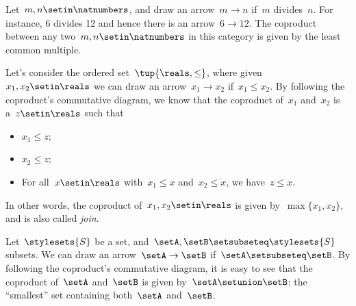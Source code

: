 \begin{example}
    Let~$m,n\setin \natnumbers$, and draw an arrow~$m\to n$ if~$m$ divides~$n$.
    For instance, 6 divides 12 and hence there is an arrow~$6\to 12$.
    The coproduct between any two~$m,n\setin \natnumbers$ in this category is given by the least common multiple.
\end{example}

\begin{example}
    Let's consider the ordered set~$\tup{\reals,\leq}$, where given~$x_1,x_2\setin \reals$ we can draw an arrow~$x_1\to x_2$ if~$x_1\leq x_2$.
    By following the coproduct's commutative diagram, we know that the coproduct of~$x_1$ and~$x_2$ is a~$z\setin \reals$ such that
    \begin{itemize}
        \item $x_1\leq z$;
        \item $x_2\leq z$;
        \item For all~$x\setin \reals$ with~$x_1\leq x$ and~$x_2\leq x$, we have~$z\leq x$.
    \end{itemize}
    In other words, the coproduct of~$x_1,x_2\setin \reals$ is given by~$\max\{x_1,x_2\}$, and is also called \emph{join}.
\end{example}

\begin{example}
    \label{ex:subset_coprod}
    Let~$\stylesets{S}$ be a set, and~$\setA,\setB\setsubseteq \stylesets{S}$ subsets.
    We can draw an arrow~$\setA\to \setB$ if~$\setA\setsubseteq \setB$.
    By following the coproduct's commutative diagram, it is easy to see that the coproduct of~$\setA$ and~$\setB$ is given by~$\setA\setunion\setB$: the ``smallest'' set containing both~$\setA$ and~$\setB$.
\end{example}

